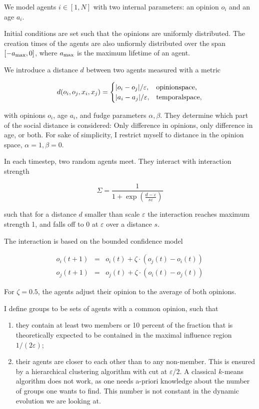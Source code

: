 \documentclass[useAMS,usenatbib]{mn2e}
\begin{document}
We model agents $i\in[1,N]$ with two internal parameters: an opinion
$o_i$ and an age $a_i$.

Initial conditions are set such that the opinions are uniformly
distributed. The creation times of the agents are also unfiormly
distributed over the span $[-a_{\rm max},0]$, where $a_{\rm max}$ is the maximum lifetime
of an agent. 

We introduce a distance $d$ between two agents measured with a metric

\begin{equation}
    d(o_i,o_j,x_i, x_j) =
    \begin{cases}
        |o_i-o_j|/\varepsilon,&{\rm opinion space},\\
        |a_i-a_j|/\varepsilon,&{\rm temporal space},
    \end{cases}
\end{equation}

with opinions $o_i$, age $a_i$, and fudge
parameters $\alpha, \beta$. They determine which part of the social distance is
considered: Only difference in opinions, only difference in age, or
both. For sake of simplicity, I restrict myself to distance in the
opinion space, $\alpha=1, \beta=0$. 

In each timestep, two random
agents meet. They interact with interaction strength

\begin{equation}
    \Sigma = \frac{1}{1+\exp\left(\frac{d-\varepsilon}{s\varepsilon}\right)}
\end{equation}

such that for a distance $d$ smaller than scale $\varepsilon$ the
interaction reaches maximum strength 1, and falls off to 0 at
$\varepsilon$ over a distance $s$.

The interaction is based on the bounded confidence model

\begin{eqnarray}
    o_i(t+1) &=& o_i(t)+\zeta\cdot(o_j(t)-o_i(t))\\
    o_j(t+1) &=& o_j(t)+\zeta\cdot(o_i(t)-o_j(t))
\end{eqnarray}

For $\zeta=0.5$, the agents adjust their opinion to the average of both
opinions.


I define groups to be sets of agents with a common opinion, such that

\begin{enumerate}
    \item they contain at least two members or 10 percent of the fraction
    that is theoretically expected to be contained in the maximal
    influence region $1/(2\varepsilon)$;
    \item their agents are closer to each other than to any
    non-member. This is ensured by a hierarchical clustering algorithm
    with cut at $\varepsilon/2$. A classical $k$-means algorithm does
    not work, as one needs a-priori knowledge about the number of groups
    one wants to find. This number is not constant in the dynamic
    evolution we are looking at.
\end{enumerate}
\end{document}
